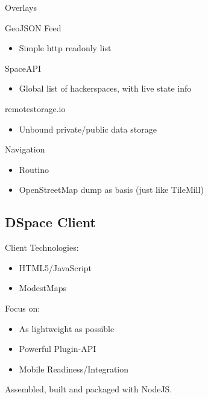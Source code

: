 \documentclass{beamer}
\begin{document}
\begin{frame}{Overlays}

GeoJSON Feed
    \begin{itemize}
      \item Simple http readonly list
     \end{itemize}
SpaceAPI
      \begin{itemize}
      \item Global list of hackerspaces, with live state info
     \end{itemize}
remotestorage.io
    \begin{itemize}
      \item Unbound private/public data storage
     \end{itemize}
Navigation
      \begin{itemize}
      \item Routino
      \item OpenStreetMap dump as basis (just like TileMill)
     \end{itemize}
\end{frame}


\subsection{DSpace Client}

\begin{frame}{Client}
 Technologies:
 \begin{itemize}
  \item HTML5/JavaScript
  \item ModestMaps
 \end{itemize}
 \vspace{1em}
 Focus on:
 \begin{itemize}
  \item As lightweight as possible
  \item Powerful Plugin-API
  \item Mobile Readiness/Integration
 \end{itemize}
 \vspace{1em}
 Assembled, built and packaged with NodeJS.
\end{frame}
\end{document}
